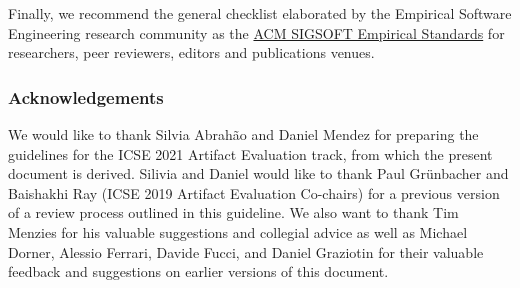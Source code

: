 \documentclass[twoside,a4paper]{refart}
\begin{document}
Finally, we recommend the general checklist elaborated by the
Empirical Software Engineering research community as the
\href{https://github.com/acmsigsoft/EmpiricalStandards}{ACM SIGSOFT
  Empirical Standards} for researchers, peer reviewers, editors and
publications venues.

\subsubsection{Acknowledgements}

We would like to thank Silvia Abrahão and Daniel Mendez for preparing
the guidelines for the ICSE 2021 Artifact Evaluation track, from which
the present document is derived. Silivia and Daniel would like to
thank Paul Grünbacher and Baishakhi Ray (ICSE 2019 Artifact Evaluation
Co-chairs) for a previous version of a review process outlined in this
guideline. We also want to thank Tim Menzies for his valuable
suggestions and collegial advice as well as Michael Dorner, Alessio
Ferrari, Davide Fucci, and Daniel Graziotin for their valuable
feedback and suggestions on earlier versions of this document.
\end{document}
